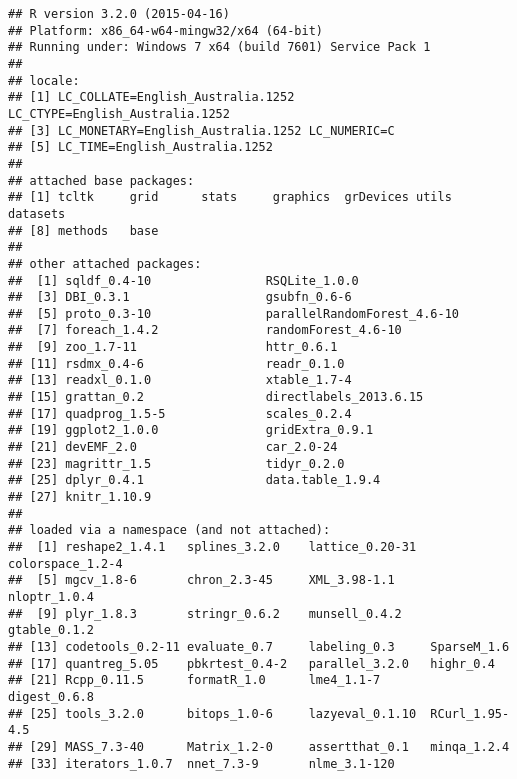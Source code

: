 \documentclass{grattan}\usepackage[]{graphicx}\usepackage[]{color}
\makeatletter
\newenvironment{kframe}{%
 \def\at@end@of@kframe{}%
 \ifinner\ifhmode%
  \def\at@end@of@kframe{\end{minipage}}%
  \begin{minipage}{\columnwidth}%
 \fi\fi%
 \def\FrameCommand##1{\hskip\@totalleftmargin \hskip-\fboxsep
 \colorbox{shadecolor}{##1}\hskip-\fboxsep
     \hskip-\linewidth \hskip-\@totalleftmargin \hskip\columnwidth}%
 \MakeFramed {\advance\hsize-\width
   \@totalleftmargin\z@ \linewidth\hsize
   \@setminipage}}%
 {\par\unskip\endMakeFramed%
 \at@end@of@kframe}
\newenvironment{knitrout}{}{} %
\makeatother
\begin{document}
\begin{knitrout}
\color{fgcolor}\begin{kframe}
\begin{verbatim}
## R version 3.2.0 (2015-04-16)
## Platform: x86_64-w64-mingw32/x64 (64-bit)
## Running under: Windows 7 x64 (build 7601) Service Pack 1
## 
## locale:
## [1] LC_COLLATE=English_Australia.1252  LC_CTYPE=English_Australia.1252   
## [3] LC_MONETARY=English_Australia.1252 LC_NUMERIC=C                      
## [5] LC_TIME=English_Australia.1252    
## 
## attached base packages:
## [1] tcltk     grid      stats     graphics  grDevices utils     datasets 
## [8] methods   base     
## 
## other attached packages:
##  [1] sqldf_0.4-10                RSQLite_1.0.0              
##  [3] DBI_0.3.1                   gsubfn_0.6-6               
##  [5] proto_0.3-10                parallelRandomForest_4.6-10
##  [7] foreach_1.4.2               randomForest_4.6-10        
##  [9] zoo_1.7-11                  httr_0.6.1                 
## [11] rsdmx_0.4-6                 readr_0.1.0                
## [13] readxl_0.1.0                xtable_1.7-4               
## [15] grattan_0.2                 directlabels_2013.6.15     
## [17] quadprog_1.5-5              scales_0.2.4               
## [19] ggplot2_1.0.0               gridExtra_0.9.1            
## [21] devEMF_2.0                  car_2.0-24                 
## [23] magrittr_1.5                tidyr_0.2.0                
## [25] dplyr_0.4.1                 data.table_1.9.4           
## [27] knitr_1.10.9               
## 
## loaded via a namespace (and not attached):
##  [1] reshape2_1.4.1   splines_3.2.0    lattice_0.20-31  colorspace_1.2-4
##  [5] mgcv_1.8-6       chron_2.3-45     XML_3.98-1.1     nloptr_1.0.4    
##  [9] plyr_1.8.3       stringr_0.6.2    munsell_0.4.2    gtable_0.1.2    
## [13] codetools_0.2-11 evaluate_0.7     labeling_0.3     SparseM_1.6     
## [17] quantreg_5.05    pbkrtest_0.4-2   parallel_3.2.0   highr_0.4       
## [21] Rcpp_0.11.5      formatR_1.0      lme4_1.1-7       digest_0.6.8    
## [25] tools_3.2.0      bitops_1.0-6     lazyeval_0.1.10  RCurl_1.95-4.5  
## [29] MASS_7.3-40      Matrix_1.2-0     assertthat_0.1   minqa_1.2.4     
## [33] iterators_1.0.7  nnet_7.3-9       nlme_3.1-120
\end{verbatim}
\end{kframe}
\end{knitrout}
\twocolumn

\printbibliography
\end{document}
